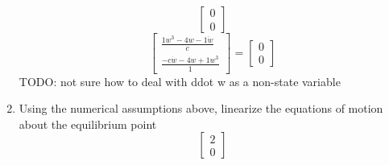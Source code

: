 \begin{enumerate}
\begin{equation}
\begin{bmatrix}
      0 \\
      0
    \end{bmatrix}
  \end{equation}
  \begin{equation}
    \begin{bmatrix}
      \frac{1w^3 - 4w -  1 \ddot w}{c} \\
      \frac{- c\dot w - 4w + 1w^3}{1}
    \end{bmatrix} =
    \begin{bmatrix}
      0 \\
      0
    \end{bmatrix}
  \end{equation}
  {\LARGE \color{red} TODO: not sure how to deal with ddot w as a non-state variable}
\item Using the numerical assumptions above, linearize the equations of motion about the equilibrium point
  \label{one_equilibrium}
  \begin{equation}
\begin{bmatrix}
2\\
0
\end{bmatrix}\end{equation}


\end{enumerate}
